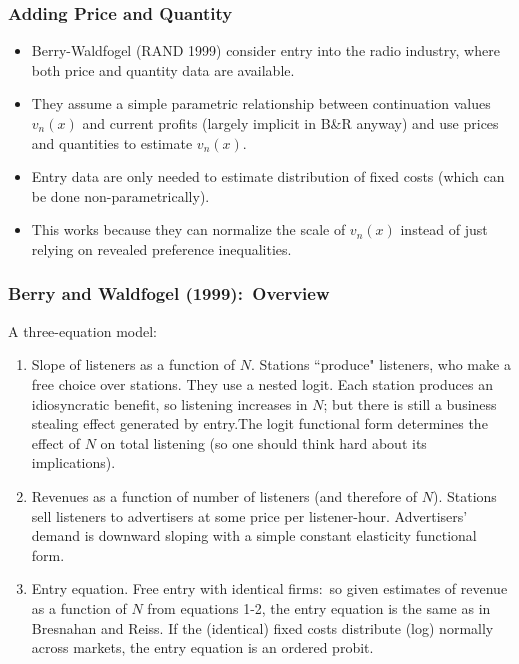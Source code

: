 \begin{frame} \frametitle{Adding Price and Quantity}
\begin{itemize}
\item Berry-Waldfogel (RAND 1999) consider entry into the radio industry,
where both price and quantity data are available.
\item They assume a simple parametric relationship between continuation
values $v_n(x)$ and current profits (largely implicit in B\&R anyway) and use
prices and quantities to estimate $v_n(x)$.
\item Entry data are only needed to estimate distribution of fixed costs (which can be done non-parametrically).
\item This works because they can normalize the scale of $v_n(x)$ instead of just relying on revealed preference inequalities.
\end{itemize}
\end{frame}




\begin{frame}
\frametitle{Berry and Waldfogel (1999):\ Overview}

A three-equation model:

\begin{enumerate}
\item Slope of listeners as a function of $N.$ Stations ``produce" listeners,
who make a free choice over stations. They use a nested logit. Each station
produces an idiosyncratic benefit, so listening increases in $N$; but there
is still a business stealing effect generated by entry.The logit functional
form determines the effect of $N$ on total listening (so one should think
hard about its implications).

\item Revenues as a function of number of listeners (and therefore of $N$).
Stations sell listeners to advertisers at some price per listener-hour.
Advertisers' demand is downward sloping with a simple constant elasticity
functional form.

\item Entry equation. Free entry with identical firms:\ so given estimates
of revenue as a function of $N$ from equations 1-2, the entry equation is
the same as in Bresnahan and Reiss. If the
(identical) fixed costs distribute (log) normally across markets, the entry
equation is an ordered probit.
\end{enumerate}
\end{frame}



